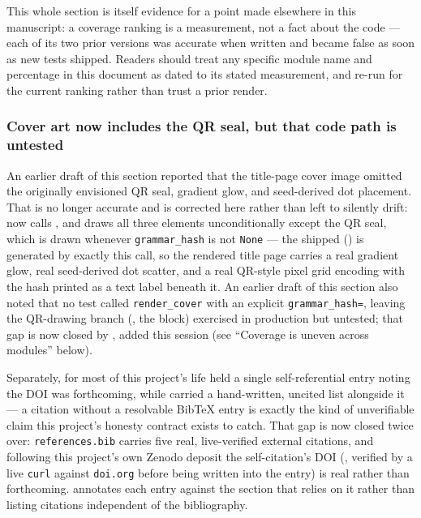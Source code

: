 \documentclass[
]{article}
\begin{document}
This whole section is itself evidence for a point made elsewhere in this
manuscript: a coverage ranking is a measurement, not a fact about the
code --- each of its two prior versions was accurate when written and
became false as soon as new tests shipped. Readers should treat any
specific module name and percentage in this document as dated to its
stated measurement, and re-run  for the
current ranking rather than trust a prior render.

\subsubsection{Cover art now includes the QR seal, but that code path is
untested}\label{cover-art-now-includes-the-qr-seal-but-that-code-path-is-untested}

An earlier draft of this section reported that the title-page cover
image omitted the originally envisioned QR seal, gradient glow, and
seed-derived dot placement. That is no longer accurate and is corrected
here rather than left to silently drift:
 now calls
, and
 draws all three elements unconditionally
except the QR seal, which is drawn whenever \texttt{grammar\_hash} is
not \texttt{None} --- the shipped 
() is generated by exactly this call,
so the rendered title page carries a real gradient glow, real
seed-derived dot scatter, and a real QR-style pixel grid encoding
 with the hash printed as a text label beneath
it. An earlier draft of this section also noted that no test called
\texttt{render\_cover} with an explicit \texttt{grammar\_hash=}, leaving
the QR-drawing branch (, the
 block) exercised in
production but untested; that gap is now closed by
,
added this session (see ``Coverage is uneven across modules'' below).

Separately, for most of this project's life
 held a single self-referential
 entry noting the DOI was forthcoming,
while  carried a hand-written, uncited list
alongside it --- a citation without a resolvable BibTeX entry is exactly
the kind of unverifiable claim this project's honesty contract exists to
catch. That gap is now closed twice over: \texttt{references.bib}
carries five real, live-verified external citations, and following this
project's own Zenodo deposit the self-citation's DOI
(, verified by a live \texttt{curl}
against \texttt{doi.org} before being written into the entry) is real
rather than forthcoming.  annotates each entry
against the section that relies on it rather than listing citations
independent of the bibliography.
\end{document}
